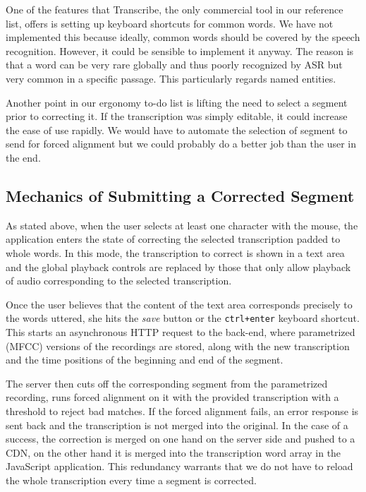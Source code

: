 \documentclass{svproc}
\begin{document}
One of the features that Transcribe, the only commercial tool in our reference
list, offers is setting up keyboard shortcuts for common words. We have not
implemented this because ideally, common words should be covered by the speech
recognition. However, it could be sensible to implement it anyway. The reason is
that a word can be very rare globally and thus poorly recognized by ASR but very
common in a specific passage. This particularly regards named entities.

Another point in our ergonomy to-do list is lifting the need to select a segment
prior to correcting it. If the transcription was simply editable, it could
increase the ease of use rapidly. We would have to automate the selection of
segment to send for forced alignment but we could probably do a better job than
the user in the end.

\subsection{Mechanics of Submitting a Corrected Segment}

As stated above, when the user selects at least one character with the mouse,
the application enters the state of correcting the selected transcription padded
to whole words. In this mode, the transcription to correct is shown in a
text area and the global playback controls are replaced by those that only allow
playback of audio corresponding to the selected transcription.

Once the user believes that the content of the text area corresponds precisely
to the words uttered, she hits the {\em save} button or the \texttt{ctrl+enter}
keyboard shortcut. This starts an asynchronous HTTP request to the back-end,
where parametrized (MFCC) versions of the recordings are stored, along with the
new transcription and the time positions of the beginning and end of the
segment.

The server then cuts off the corresponding segment from the parametrized
recording, runs forced alignment on it with the provided transcription with a
threshold to reject bad matches. If the forced alignment fails, an error
response is sent back and the transcription is not merged into the original. In
the case of a success, the correction is merged on one hand on the server side
and pushed to a CDN, on the other hand it is merged into the transcription word
array in the JavaScript application. This redundancy warrants that we do not
have to reload the whole transcription every time a segment is corrected.
\end{document}
